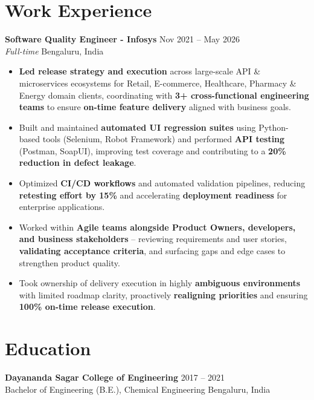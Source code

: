 \documentclass[10pt,a4paper]{article}
\begin{document}
\section{Work Experience}
\textbf{Software Quality Engineer - Infosys} \hfill Nov 2021 -- May 2026 \\
\textit{Full-time} \hfill Bengaluru, India
\begin{itemize}
    \item \textbf{Led release strategy and execution} across large-scale API \& microservices ecosystems for Retail, E-commerce, Healthcare, Pharmacy \& Energy domain clients, coordinating with \textbf{3+ cross-functional engineering teams} to ensure \textbf{on-time feature delivery} aligned with business goals.
    \item Built and maintained \textbf{automated UI regression suites} using Python-based tools (Selenium, Robot Framework) and performed \textbf{API testing} (Postman, SoapUI), improving test coverage and contributing to a \textbf{20\% reduction in defect leakage}.
    \item Optimized \textbf{CI/CD workflows} and automated validation pipelines, reducing \textbf{retesting effort by 15\%} and accelerating \textbf{deployment readiness} for enterprise applications.
    \item Worked within \textbf{Agile teams alongside Product Owners, developers, and business stakeholders} -- reviewing requirements and user stories, \textbf{validating acceptance criteria}, and surfacing gaps and edge cases to strengthen product quality.
    \item Took ownership of delivery execution in highly \textbf{ambiguous environments} with limited roadmap clarity, proactively \textbf{realigning priorities} and ensuring \textbf{100\% on-time release execution}.
\end{itemize}
\vspace{1pt}

\section{Education}
\textbf{Dayananda Sagar College of Engineering} \hfill 2017 -- 2021 \\
Bachelor of Engineering (B.E.), Chemical Engineering \hfill Bengaluru, India
\end{document}
